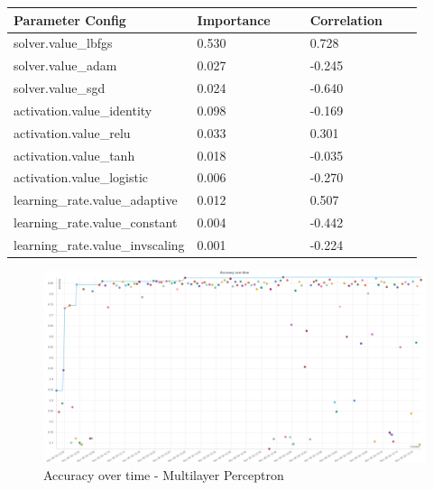 \documentclass[11pt]{article}
\begin{document}
\begin{appendices}
  
  \begin{table}[ht]
    \centering
    \begin{tabular}{|p{0.3\linewidth} | p{0.3\linewidth}| p{0.3\linewidth}|} 
      \hline
      \textbf{Parameter Config}  & \textbf{Importance} & \textbf{Correlation} \\ \hline
        solver.value\_lbfgs & 0.530 & 0.728 \\ \hline
        solver.value\_adam & 0.027 & -0.245 \\ \hline
        solver.value\_sgd & 0.024 & -0.640 \\ \hline
        activation.value\_identity & 0.098 & -0.169 \\ \hline
        activation.value\_relu & 0.033 & 0.301 \\ \hline
        activation.value\_tanh & 0.018 & -0.035 \\ \hline
        activation.value\_logistic & 0.006 & -0.270 \\ \hline
        learning\_rate.value\_adaptive & 0.012 & 0.507 \\ \hline
        learning\_rate.value\_constant & 0.004 & -0.442 \\ \hline
        learning\_rate.value\_invscaling & 0.001 & -0.224 \\ \hline
    \end{tabular}
  \end{table}\label{MLP_ParamImp2}

\begin{figure}
    \caption {Accuracy over time - Multilayer Perceptron} \label{MLPAccOverTime}
    \centering
    \includegraphics[width = \textwidth, height = \textwidth, keepaspectratio]{Images/MLP Acc over time.png}
\end{figure}


\end{appendices}
\end{document}
